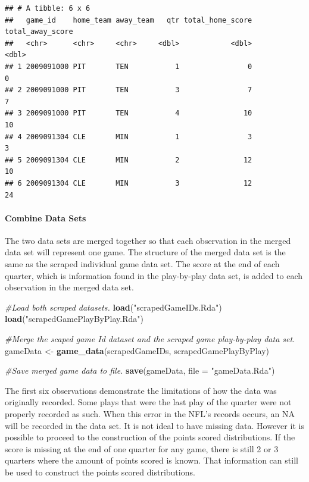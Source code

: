 \documentclass[
]{article}
\newenvironment{Shaded}{\begin{snugshade}}{\end{snugshade}}
\newcommand{\CommentTok}[1]{\textcolor[rgb]{0.56,0.35,0.01}{\textit{#1}}}
\newcommand{\DataTypeTok}[1]{\textcolor[rgb]{0.13,0.29,0.53}{#1}}
\newcommand{\KeywordTok}[1]{\textcolor[rgb]{0.13,0.29,0.53}{\textbf{#1}}}
\newcommand{\NormalTok}[1]{#1}
\newcommand{\StringTok}[1]{\textcolor[rgb]{0.31,0.60,0.02}{#1}}
\let\oldparagraph\paragraph
\renewcommand{\paragraph}[1]{\oldparagraph{#1}\mbox{}}
\begin{document}
\begin{verbatim}
## # A tibble: 6 x 6
##   game_id    home_team away_team   qtr total_home_score total_away_score
##   <chr>      <chr>     <chr>     <dbl>            <dbl>            <dbl>
## 1 2009091000 PIT       TEN           1                0                0
## 2 2009091000 PIT       TEN           3                7                7
## 3 2009091000 PIT       TEN           4               10               10
## 4 2009091304 CLE       MIN           1                3                3
## 5 2009091304 CLE       MIN           2               12               10
## 6 2009091304 CLE       MIN           3               12               24
\end{verbatim}

\hypertarget{combine-data-sets}{%
\paragraph{Combine Data Sets}\label{combine-data-sets}}

The two data sets are merged together so that each observation in the
merged data set will represent one game. The structure of the merged
data set is the same as the scraped individual game data set. The score
at the end of each quarter, which is information found in the
play-by-play data set, is added to each observation in the merged data
set.

\begin{Shaded}
\begin{Highlighting}[]
\CommentTok{#Load both scraped datasets.}
\KeywordTok{load}\NormalTok{(}\StringTok{"scrapedGameIDs.Rda"}\NormalTok{)}
\KeywordTok{load}\NormalTok{(}\StringTok{"scrapedGamePlayByPlay.Rda"}\NormalTok{)}

\CommentTok{#Merge the scaped game Id dataset and the scraped game play-by-play data set.}
\NormalTok{gameData <-}\StringTok{ }\KeywordTok{game_data}\NormalTok{(scrapedGameIDs, scrapedGamePlayByPlay)}

\CommentTok{#Save merged game data to file.}
\KeywordTok{save}\NormalTok{(gameData, }\DataTypeTok{file =} \StringTok{"gameData.Rda"}\NormalTok{)}
\end{Highlighting}
\end{Shaded}

The first six observations demonstrate the limitations of how the data
was originally recorded. Some plays that were the last play of the
quarter were not properly recorded as such. When this error in the NFL's
records occurs, an NA will be recorded in the data set. It is not ideal
to have missing data. However it is possible to proceed to the
construction of the points scored distributions. If the score is missing
at the end of one quarter for any game, there is still 2 or 3 quarters
where the amount of points scored is known. That information can still
be used to construct the points scored distributions.
\end{document}
